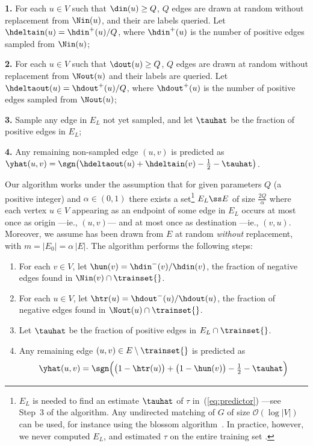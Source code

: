 \textbf{1.} For each $u \in V$ such that $\din(u) \ge Q$, $Q$ edges are drawn at random without
replacement from $\Nin(u)$, and their are labels queried. Let $\hdeltain(u) = \hdin^+(u)/Q$, where
$\hdin^+(u)$ is the number of positive edges sampled from $\Nin(u)$;

\textbf{2.} For each $u \in V$ such that $\dout(u) \ge Q$, $Q$ edges are drawn at random without
replacement from $\Nout(u)$ and their labels are queried. Let $ \hdeltaout(u) = \hdout^+(u)/Q $,
where $\hdout^+(u)$ is the number of positive edges sampled from $\Nout(u)$;

\textbf{3.} Sample any edge in $E_L$ not yet sampled, and let $\tauhat$ be the fraction of positive
edges in $E_L$;

\textbf{4.} Any remaining non-sampled edge $(u,v)$ is predicted as $ \yhat(u,v) =
\sgn\big(\hdeltaout(u) + \hdeltain(v) - \tfrac{1}{2} - \tauhat \big) $.
\fi

Our algorithm works under the assumption that for given parameters $Q$ (a positive integer) and
$\alpha \in (0,1)$ there exists a set\footnote{$E_L$ is needed to find an estimate $\tauhat$ of
$\tau$ in~(\ref{eq:predictor}) ---see Step~3 of the algorithm. Any undirected matching of $G$ of
size $\mathcal{O}(\log|V|)$ can be used, for instance using the blossom
algorithm~\autocite{matching65}. In practice, however, we never computed $E_L$, and estimated $\tau$
on the entire training set \trainset{}.} $E_L \ss E$ of size $\tfrac{2Q}{\alpha}$ where each vertex
$u \in V$ appearing as an endpoint of some edge in $E_L$ occurs at most once as origin ---ie{}.,
$(u,v)$--- and at most once as destination ---ie{}., $(v,u)$. Moreover, we assume \trainset{} has
been drawn from $E$ at random {\em without} replacement, with $m = |E_0| = \alpha\,|E|$. The
algorithm performs the following steps:

\begin{enumerate}[label=\textbf{\arabic*.}]
	\item For each $v \in V$, let $\hun(v) = \hdin^-(v)/\hdin(v)$, \ie{} the fraction of
	  negative edges found in $\Nin(v) \cap \trainset{}$.

	\item For each $u \in V$, let $\htr(u) = \hdout^-(u)/\hdout(u)$, \ie{} the fraction of
	  negative edges found in $\Nout(u) \cap \trainset{}$.

	\item Let $\tauhat$ be the fraction of positive edges in $E_L\cap \trainset{}$.

	\item Any remaining edge $(u,v) \in E\setminus \trainset{}$ is predicted as
		$$
		\yhat(u,v) = \sgn\Big(\big(1-\htr(u)\big) + \big(1-\hun(v)\big) - \tfrac{1}{2} -\tauhat\Big)
		$$
\end{enumerate}

